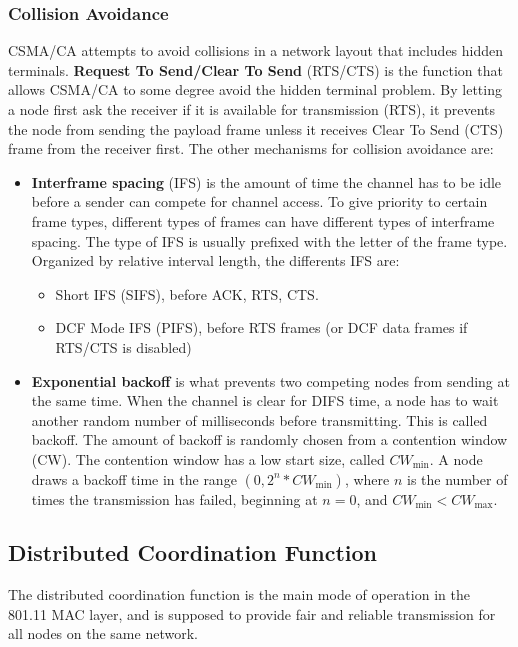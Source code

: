 \documentclass[a4paper,UKenglish]{report}
\begin{document}
\subsubsection{Collision Avoidance}
CSMA/CA attempts to avoid collisions in a network layout that includes hidden terminals. \textbf{Request To Send/Clear To Send} (RTS/CTS)
is the function that allows CSMA/CA to some degree avoid the hidden terminal problem. By letting a node first ask the receiver if it is
available for transmission (RTS), it prevents the node from sending the payload frame unless it receives Clear To Send (CTS) frame from the receiver first.
The other mechanisms for collision avoidance are: 
\begin{itemize}	
	\item \textbf{Interframe spacing} (IFS) is the amount of time the channel has to be idle before a sender can compete for channel access. 
		To give priority to certain frame types, different types of frames can have different types of interframe spacing. The type of IFS is usually 
		prefixed with the letter of the frame type. Organized by relative interval length, the differents IFS are:
		\begin{itemize} 
			\item Short IFS (SIFS), before ACK, RTS, CTS.  
			\item DCF Mode IFS (PIFS), before RTS frames (or DCF data frames if RTS/CTS is disabled)

		\end{itemize}
	\item \textbf{Exponential backoff} is what prevents two competing nodes from sending at the same time. When the channel is clear
		for DIFS time, a node has to wait another  random number of milliseconds before transmitting. This is called backoff.
		The amount of backoff is randomly chosen from a contention window (CW). The contention window has a low start size,
		called $CW_{\text{min}}$. A node draws a backoff time in the range $(0, 2^n*CW_{\text{min}})$, where $n$ is the number 
		of times the transmission has failed, beginning at $n=0$, and $CW_{\text{min}}<CW_{\text{max}}$.
\end{itemize}

\subsection{Distributed Coordination Function}
The distributed coordination function is the main mode of operation in the 801.11 MAC layer, and is supposed to provide fair and reliable 
transmission for all nodes on the same network. 
\end{document}
